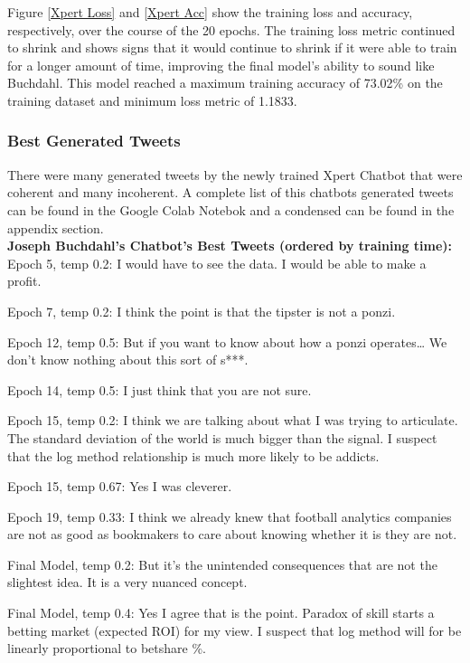 \documentclass[5p,authoryear]{elsarticle}
\begin{document}
Figure \ref{Xpert Loss} and \ref{Xpert Acc} show the training loss and accuracy, respectively, over the course of the 20 epochs. The training loss metric continued to shrink and shows signs that it would continue to shrink if it were able to train for a longer amount of time, improving the final model’s ability to sound like Buchdahl. This model reached a maximum training accuracy of 73.02\% on the training dataset and minimum loss metric of 1.1833.


\subsubsection{Best Generated Tweets}

There were many generated tweets by the newly trained Xpert Chatbot that were coherent and many incoherent. A complete list of this chatbots generated tweets can be found in the Google Colab Notebok and a condensed can be found in the appendix section.\\

\textbf{Joseph Buchdahl’s Chatbot’s Best Tweets (ordered by training time):}\\

Epoch 5, temp 0.2: I would have to see the data. I would be able to make a profit.

Epoch 7, temp 0.2: I think the point is that the tipster is not a ponzi. 

Epoch 12, temp 0.5: But if you want to know about how a ponzi operates… We don’t know nothing about this sort of s***.

Epoch 14, temp 0.5: I just think that you are not sure.

Epoch 15, temp 0.2: I think we are talking about what I was trying to articulate. The standard deviation of the world is much bigger than the signal. I suspect that the log method relationship is much more likely to be addicts.

Epoch 15, temp 0.67: Yes I was cleverer.

Epoch 19, temp 0.33: I think we already knew that football analytics companies are not as good as bookmakers to care about knowing whether it is they are not.

Final Model, temp 0.2: But it's the unintended consequences that are not the slightest idea. It is a very nuanced concept.

Final Model, temp 0.4: Yes I agree that is the point. Paradox of skill starts a betting market (expected ROI) for my view. I suspect that log method will for be linearly proportional to betshare \%.
\end{document}
